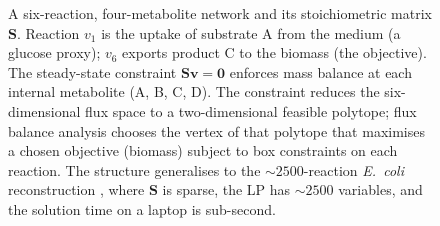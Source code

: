 \begin{figure}[htbp]
\caption[Toy flux-balance network]{A six-reaction, four-metabolite
network and its stoichiometric matrix $\mathbf{S}$. Reaction $v_1$ is
the uptake of substrate A from the medium (a glucose proxy); $v_6$
exports product C to the biomass (the objective). The steady-state
constraint $\mathbf{S}\mathbf{v} = \mathbf{0}$ enforces mass balance
at each internal metabolite (A, B, C, D). The constraint reduces the
six-dimensional flux space to a two-dimensional feasible polytope;
flux balance analysis chooses the vertex of that polytope that
maximises a chosen objective (biomass) subject to box constraints on
each reaction. The structure generalises to the $\sim 2500$-reaction
\emph{E.~coli} reconstruction \cite{paper:v6c02-orth-cobra-2010},
where $\mathbf{S}$ is sparse, the LP has $\sim 2500$ variables, and
the solution time on a laptop is sub-second.}
\label{fig:vol06:ch02:mfa-toy}
\end{figure}
